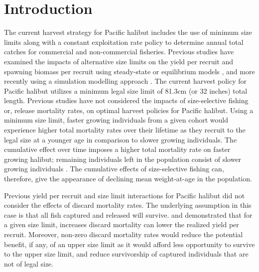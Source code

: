 % 



\section*{Introduction} %
\label{sec:introduction}

The current harvest strategy for Pacific halibut includes the use of minimum size limits along with a constant exploitation rate policy to determine annual total catches for commercial and non-commercial fisheries.  Previous studies have examined the impacts of alternative size limits on the yield per recruit and spawning biomass per recruit using steady-state or equilibrium models \citep{clark1995re}, and more recently using a simulation modelling approach \citep{clark2006assessment}.  The current harvest policy for Pacific halibut utilizes a minimum legal size limit of 81.3cm (or 32 inches) total length.  Previous studies have not considered the impacts of size-selective fishing or, release mortality rates, on optimal harvest policies for Pacific halibut.  Using a minimum size limit, faster growing individuals from a given cohort would experience higher total mortality rates over their lifetime as they recruit to the legal size at a younger age in comparison to slower growing individuals. The cumulative effect over time imposes a higher total mortality rate on faster growing halibut; remaining individuals left in the population consist of slower growing individuals \citep{Taylor2005}.  The cumulative effects of size-selective fishing can, therefore, give the appearance of declining mean weight-at-age in the population.

Previous yield per recruit and size limit interactions for Pacific halibut did not consider the effects of discard mortality rates. The underlying assumption in this case is that all fish captured and released will survive. \cite{coggins2007ecm} and \cite{pineiii2008car} demonstrated that for a given size limit, increases discard mortality can lower the realized yield per recruit. Moreover, non-zero discard mortality rates would reduce the potential benefit, if any, of an upper size limit as it would afford less opportunity to survive to the upper size limit, and reduce survivorship of captured individuals that are not of legal size.

